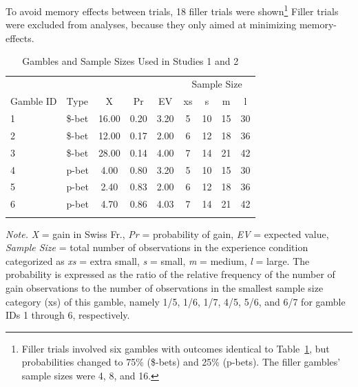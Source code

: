 \documentclass[a4paper, man, natbib, floatsintext]{apa6}
\begin{document}
To avoid memory effects between trials, 18 filler trials were shown\footnote{Filler trials involved six gambles with outcomes identical to Table~\ref{table:Lotteries}, but probabilities changed to 75\% (\$-bets) and 25\% (p-bets). The filler gambles' sample sizes were 4, 8, and 16.} Filler trials were excluded from analyses, because they only aimed at minimizing memory-effects.

\begin{table}[bth]
\begin{center}
\begin{threeparttable}
\caption{Gambles and Sample Sizes Used in Studies 1 and 2\label{table:Lotteries}}
\begin{tabular}{llccccccc}
\toprule
 &  &  &  &  & \multicolumn{4}{c}{Sample Size} \\
\cmidrule(r){6-9}
Gamble ID & Type & X & Pr & EV & xs & s & m & l\\
\midrule
1 & \$-bet & 16.00 & 0.20 & 3.20 & 5 & 10 & 15 & 30\\
2 & \$-bet & 12.00 & 0.17 & 2.00 & 6 & 12 & 18 & 36\\
3 & \$-bet & 28.00 & 0.14 & 4.00 & 7 & 14 & 21 & 42\\
4 & p-bet & 4.00 & 0.80 & 3.20 & 5 & 10 & 15 & 30\\
5 & p-bet & 2.40 & 0.83 & 2.00 & 6 & 12 & 18 & 36\\
6 & p-bet & 4.70 & 0.86 & 4.03 & 7 & 14 & 21 & 42\\
\bottomrule
\addlinespace
\end{tabular}
\begin{tablenotes}[para]
\normalsize{\textit{Note.} \textit{X} = gain in Swiss Fr., \textit{Pr} = probability of gain, \textit{EV} = expected value, \textit{Sample Size} = total number of observations in the experience condition categorized as \textit{xs} = extra small, \textit{s} = small, \textit{m} = medium, \textit{l} = large. The probability is expressed as the ratio of the relative frequency of the number of gain observations to the number of observations in the smallest sample size category (xs) of this gamble, namely 1/5, 1/6, 1/7, 4/5, 5/6, and 6/7 for gamble IDs 1 through 6, respectively.}
\end{tablenotes}
\end{threeparttable}
\end{center}
\end{table}
\end{document}

